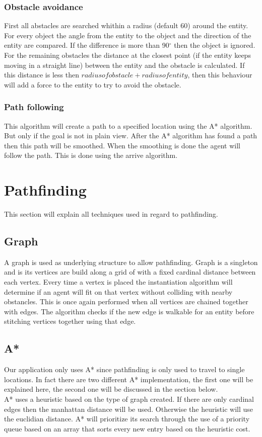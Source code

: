 \documentclass[10pt]{extarticle} %
\begin{document}
  \subsubsection {Obstacle avoidance}
  First all abstacles are searched whithin a radius (default 60) around the entity. For every object the angle from the entity to the object and the direction of the entity are compared. If the difference is more than 90$^{\circ}$ then the object is ignored. For the remaining obstacles the distance at the closest point (if the entity keeps moving in a straight line) between the entity and the obstacle is calculated. If this distance is less then \(radius of obstacle + radius of entity\), then this behaviour will add a force to the entity to try to avoid the obstacle.
  \subsubsection {Path following}
   This algorithm will create a path to a specified location using the A* algorithm. But only if the goal is not in plain view. After the A* algorithm has found a path then this path will be smoothed. When the smoothing is done the agent will follow the path. This is done using the arrive algorithm. 
   \newpage
   
   \section {Pathfinding}
This section will explain all techniques used in regard to pathfinding. 
   \subsection {Graph}
  A graph is used as underlying structure to allow pathfinding. Graph is a singleton and is its vertices are build along a grid of with a fixed cardinal distance between each vertex. Every time a vertex is placed the instantiation algorithm will determine if an agent will fit on that vertex without colliding with nearby obstancles. This is once again performed when all vertices are chained together with edges. The algorithm checks if the new edge is walkable for an entity before stitching vertices together using that edge.
   \subsection {A*}
  Our application only uses A* since pathfinding is only used to travel to single locations. In fact there are two different A* implementation, the first one will be explained here, the second one will be discussed in the section below. \\
  A* uses a heuristic based on the type of graph created. If there are only cardinal edges then the manhattan distance will be used. Otherwise the heuristic will use the euclidian distance. A* will prioritize its search through the use of a priority queue based on an array that sorts every new entry based on the heuristic cost. 
\end{document}

